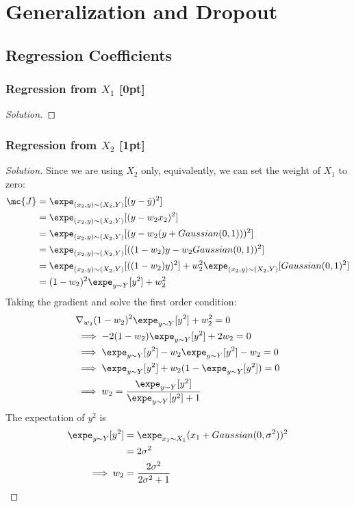 \documentclass{article}
\begin{document}
	\section{Generalization and Dropout}
	\subsection{Regression Coefficients}
	\subsubsection{Regression from $X_1$ [0pt]}
	\begin{proof}[Solution]
		
	\end{proof}
	
	\subsubsection{Regression from $X_2$ [1pt]}
	\begin{proof}[Solution]
		Since we are using $X_2$ only, equivalently, we can set the weight of $X_1$ to zero:
		\begin{align}
			\mc{J} &= \expe_{(x_2, y) \sim (X_2, Y)} [(y - \hat{y})^2] \\
			&= \expe_{(x_2, y) \sim (X_2, Y)} [(y - w_2 x_2)^2] \\
			&= \expe_{(x_2, y) \sim (X_2, Y)} [(y - w_2 (y + Gaussian(0, 1)))^2] \\
			&= \expe_{(x_2, y) \sim (X_2, Y)} [((1 - w_2)y - w_2 Gaussian(0, 1) )^2] \\
			&= \expe_{(x_2, y) \sim (X_2, Y)} [((1 - w_2)y)^2] + w_2^2 \expe_{(x_2, y) \sim (X_2, Y)}[Gaussian(0, 1)^2] \\
			&= (1 - w_2)^2 \expe_{y \sim Y} [y^2] + w_2^2
		\end{align}
		Taking the gradient and solve the first order condition:
		\begin{align}
			&\nabla_{w_2} (1 - w_2)^2 \expe_{y \sim Y} [y^2] + w_2^2 = 0 \\
			&\implies - 2(1 - w_2) \expe_{y \sim Y} [y^2] + 2 w_2 = 0 \\
			&\implies \expe_{y \sim Y} [y^2] - w_2 \expe_{y \sim Y} [y^2] - w_2 = 0 \\
			&\implies \expe_{y \sim Y} [y^2] + w_2 (1- \expe_{y \sim Y} [y^2]) = 0 \\
			&\implies w_2 = \frac{\expe_{y \sim Y} [y^2]}{\expe_{y \sim Y} [y^2] + 1}
		\end{align}
		The expectation of $y^2$ is
		\begin{align}
			\expe_{y \sim Y} [y^2] &= \expe_{x_1 \sim X_1} (x_1 + Gaussian(0, \sigma^2))^2 \\
			&= 2 \sigma^2 \\
			\implies w_2 &= \frac{2 \sigma^2}{2 \sigma^2 + 1}
		\end{align}
	\end{proof}
	
\end{document}
